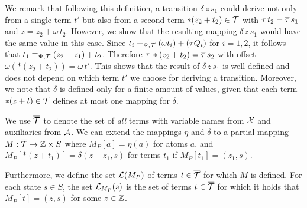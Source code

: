 We remark that following this definition, a transition $\delta\,z\,s_1$ could derive not only from a single term $t'$ but also from a second term $*(z_2 + t_2) \in \mathcal{T}$ with $\tau\,t_2=\overline{\tau}\,s_1$ and $z = z_2 + \omega\,t_2$.
However, we show that the resulting mapping $\delta\,z\,s_1$  would have the same value in this case.
Since $t_i \equiv_{\Psi,\mathcal{T}} (\omega t_i) + (\tau Q_i)$ for $i = 1,2$, it follows that $t_1 \equiv_{\Psi,\mathcal{T}} (z_2 - z_1)+ t_2$.
Therefore $\tau\,*(z_2+t_2)=\overline{\tau}\,s_2$ with offset $\omega(*(z_2+t_2)) = \omega\,t'$.
This shows that the result of $\delta\,z\,s_1$ is well defined and does not depend on which term $t'$ we choose for deriving a transition.
Moreover, we note that $\delta$ is defined only for a finite amount of values, given that each term $*(z + t) \in \mathcal{T}$ defines at most one mapping for $\delta$.

We use ${\overline{\mathcal{T}}}$ to denote the set of \emph{all} terms with variable names from $\mathcal{X}$ and auxiliaries from $\mathcal{A}$.
We can extend the mappings $\eta$ and $\delta$ to a partial mapping $M : {\overline{\mathcal{T}}} \rightarrow \mathbb{Z} \times S$ where $M_P[a] = \eta(a)$ for atoms $a$, and $M_P[*(z+t_1)] = \delta(z+z_1, s)$ for terms $t_1$ if $M_P[t_1] = (z_1,s)$.

Furthermore, we define the set $\mathcal{L}(M_P)$ of terms $t \in {\overline{\mathcal{T}}}$ for which $M$ is defined.
For each state $s \in S$, the set $\mathcal{L}_{M_P}(s)$ is the set of terms $t \in {\overline{\mathcal{T}}}$ for which it holds that $M_P[t] = (z, s)$ for some $z \in \mathbb{Z}$.

